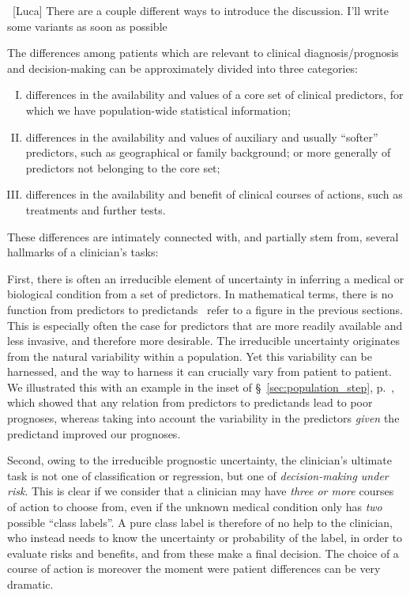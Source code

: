 \documentclass[utf8]{FrontiersinHarvard} %
\newcommand*{\wrench}{{\fontencoding{U}\fontfamily{fontawesomethree}\selectfont\symbol{114}}}
\newcommand*{\pencil}{{\fontencoding{U}\fontfamily{fontawesometwo}\selectfont\symbol{210}}}
\newcommand{\mynotew}[1]{{\color{notecolour}\wrench\ #1}}
\newcommand{\mynotep}[1]{{\color{notecolour}\pencil\ #1}}
\newcommand*{\sect}{\S}%
\renewcommand*{\|}[1][]{\nonscript\:#1\vert\nonscript\:\mathopen{}}
\begin{document}
\mynotew{[Luca] There are a couple different ways to introduce the discussion. I'll write some variants as soon as possible}

The differences among patients which are relevant to clinical diagnosis/prognosis and decision-making can be approximately divided into three categories:
\begin{enumerate}[I.]
\item\label{item:diff_corepredictors} differences in the availability and values of a core set of clinical predictors, for which we have population-wide statistical information;
\item\label{item:diff_priorinfo} differences in the availability and values of auxiliary and usually \enquote{softer} predictors, such as geographical or family background; or more generally of predictors not belonging to the core set;
\item\label{item:diff_utility} differences in the availability and benefit of clinical courses of actions, such as treatments and further tests.
\end{enumerate}

These differences are intimately connected with, and partially stem from, several hallmarks of a clinician's tasks:

First, there is often an irreducible element of uncertainty in inferring a medical or biological condition from a set of predictors. In mathematical terms, there is no function from predictors to predictands \mynotep{refer to a figure in the previous sections}. This is especially often the case for predictors that are more readily available and less invasive, and therefore more desirable. The irreducible uncertainty originates from the natural variability within a population. Yet this variability can be harnessed, and the way to harness it can crucially vary from patient to patient. We illustrated this with an example in the inset of \sect~\ref{sec:population_step}, p.~\pageref{tab:superiority_predictors_given_predictand}, which showed that any relation from predictors to predictands lead to poor prognoses, whereas taking into account the variability in the predictors \emph{given} the predictand improved our prognoses.

Second, owing to the irreducible prognostic uncertainty, the clinician's ultimate task is not one of classification or regression, but one of \emph{decision-making under risk}. This is clear if we consider that a clinician may have \emph{three or more} courses of action to choose from, even if the unknown medical condition only has \emph{two} possible \enquote{class labels}. A pure class label is therefore of no help to the clinician, who instead needs to know the uncertainty or probability of the label, in order to evaluate risks and benefits, and from these make a final decision. The choice of a course of action is moreover the moment were patient differences can be very dramatic.
\end{document}

